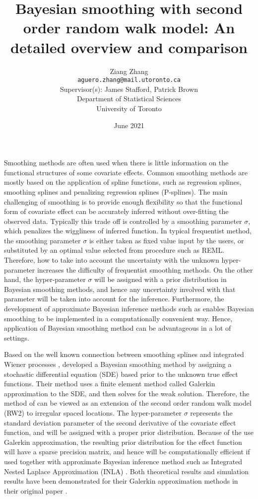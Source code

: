 \documentclass{article}
\title{\textbf{Bayesian smoothing with second order random walk model: An detailed overview and comparison}}
\author{
Ziang Zhang \\ \vspace{-0.3cm}\normalsize\texttt{aguero.zhang@mail.utoronto.ca}\\ 
\large
\vspace{0.5cm}
Supervisor(s): James Stafford, Patrick Brown \\ 

\vspace{0.5cm}
Department of Statistical Sciences \\
University of Toronto
}
\date{June 2021}
\begin{document}
\maketitle

Smoothing methods are often used when there is little information on the functional structures of some covariate effects. Common smoothing methods are mostly based on the application of spline functions, such as regression splines, smoothing splines and penalizing regression splines (P-splines). The main challenging of smoothing is to provide enough flexibility so that the functional form of covariate effect can be accurately inferred without over-fitting the observed data. Typically this trade off is controlled by a smoothing parameter $\sigma$, which penalizes the wiggliness of inferred function. In typical frequentist method, the smoothing parameter $\sigma$ is either taken as fixed value input by the users, or substituted by an optimal value selected from procedure such as REML. Therefore, how to take into account the uncertainty with the unknown hyper-parameter increases the difficulty of frequentist smoothing methods. On the other hand, the hyper-parameter $\sigma$ will be assigned with a prior distribution in Bayesian smoothing methods, and hence any uncertainty involved with that parameter will be taken into account for the inference. Furthermore, the development of approximate Bayesian inference methods such as \cite{inla} enables Bayesian smoothing to be implemented in a computationally convenient way. Hence, application of Bayesian smoothing method can be advantageous in a lot of settings.


Based on the well known connection between smoothing splines and integrated Wiener processes \citep{wahba}, \cite{rw2} developed a Bayesian smoothing method by assigning a stochastic differential equation (SDE) based prior to the unknown true effect functions. 
Their method uses a finite element method called Galerkin approximation to the SDE, and then solves for the weak solution. Therefore, the method of \cite{inla} can be viewed as an extension of the second order random walk model (RW2) to irregular spaced locations.
The hyper-parameter $\sigma$ represents the standard deviation parameter of the second derivative of the covariate effect function, and will be assigned with a proper prior distribution. Because of the use Galerkin approximation, the resulting prior distribution for the effect function will have a sparse precision matrix, and hence will be computationally efficient if used together with approximate Bayesian inference method such as Integrated Nested Laplace Approximation (INLA) \citep{inla}. Both theoretical results and simulation results have been demonstrated for their Galerkin approximation methods in their original paper \citep{rw2}.
\end{document}
